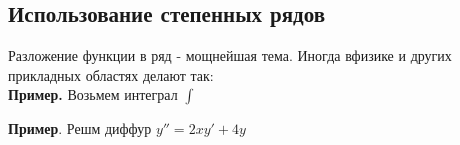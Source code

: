 \subsection{Использование степенных рядов}
Разложение функции в ряд - мощнейшая тема. Иногда вфизике и других прикладных
областях делают так:\\
\textbf{Пример.} Возьмем интеграл
$\int\limits$ 


\textbf{Пример}. Решм диффур $y''=2xy'+4y$
